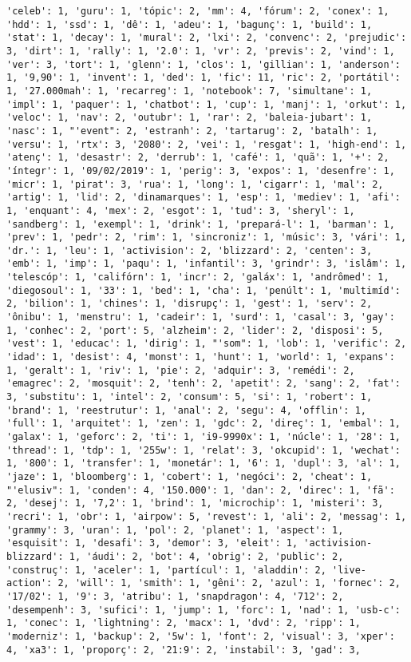 \documentclass[11pt]{article}
\begin{document}
\begin{Verbatim}[commandchars=\\\{\}]
'celeb': 1, 'guru': 1, 'tópic': 2, 'mm': 4, 'fórum': 2, 'conex': 1, 'hdd': 1, 'ssd': 1, 'dê': 1, 'adeu': 1, 'bagunç': 1, 'build': 1, 'stat': 1, 'decay': 1, 'mural': 2, 'lxi': 2, 'convenc': 2, 'prejudic': 3, 'dirt': 1, 'rally': 1, '2.0': 1, 'vr': 2, 'previs': 2, 'vind': 1, 'ver': 3, 'tort': 1, 'glenn': 1, 'clos': 1, 'gillian': 1, 'anderson': 1, '9,90': 1, 'invent': 1, 'ded': 1, 'fic': 11, 'ric': 2, 'portátil': 1, '27.000mah': 1, 'recarreg': 1, 'notebook': 7, 'simultane': 1, 'impl': 1, 'paquer': 1, 'chatbot': 1, 'cup': 1, 'manj': 1, 'orkut': 1, 'veloc': 1, 'nav': 2, 'outubr': 1, 'rar': 2, 'baleia-jubart': 1, 'nasc': 1, "'event": 2, 'estranh': 2, 'tartarug': 2, 'batalh': 1, 'versu': 1, 'rtx': 3, '2080': 2, 'vei': 1, 'resgat': 1, 'high-end': 1, 'atenç': 1, 'desastr': 2, 'derrub': 1, 'café': 1, 'quã': 1, '+': 2, 'íntegr': 1, '09/02/2019': 1, 'perig': 3, 'expos': 1, 'desenfre': 1, 'micr': 1, 'pirat': 3, 'rua': 1, 'long': 1, 'cigarr': 1, 'mal': 2, 'artig': 1, 'lid': 2, 'dinamarques': 1, 'esp': 1, 'mediev': 1, 'afi': 1, 'enquant': 4, 'mex': 2, 'esgot': 1, 'tud': 3, 'sheryl': 1, 'sandberg': 1, 'exempl': 1, 'drink': 1, 'prepará-l': 1, 'barman': 1, 'prev': 1, 'pedr': 2, 'rim': 1, 'sincroniz': 1, 'músic': 3, 'vári': 1, 'dr.': 1, 'leu': 1, 'activision': 2, 'blizzard': 2, 'centen': 3, 'emb': 1, 'imp': 1, 'paqu': 1, 'infantil': 3, 'grindr': 3, 'islâm': 1, 'telescóp': 1, 'califórn': 1, 'incr': 2, 'galáx': 1, 'andrômed': 1, 'diegosoul': 1, '33': 1, 'bed': 1, 'cha': 1, 'penúlt': 1, 'multimíd': 2, 'bilion': 1, 'chines': 1, 'disrupç': 1, 'gest': 1, 'serv': 2, 'ônibu': 1, 'menstru': 1, 'cadeir': 1, 'surd': 1, 'casal': 3, 'gay': 1, 'conhec': 2, 'port': 5, 'alzheim': 2, 'lider': 2, 'disposi': 5, 'vest': 1, 'educac': 1, 'dirig': 1, "'som": 1, 'lob': 1, 'verific': 2, 'idad': 1, 'desist': 4, 'monst': 1, 'hunt': 1, 'world': 1, 'expans': 1, 'geralt': 1, 'riv': 1, 'pie': 2, 'adquir': 3, 'remédi': 2, 'emagrec': 2, 'mosquit': 2, 'tenh': 2, 'apetit': 2, 'sang': 2, 'fat': 3, 'substitu': 1, 'intel': 2, 'consum': 5, 'si': 1, 'robert': 1, 'brand': 1, 'reestrutur': 1, 'anal': 2, 'segu': 4, 'offlin': 1, 'full': 1, 'arquitet': 1, 'zen': 1, 'gdc': 2, 'direç': 1, 'embal': 1, 'galax': 1, 'geforc': 2, 'ti': 1, 'i9-9990x': 1, 'núcle': 1, '28': 1, 'thread': 1, 'tdp': 1, '255w': 1, 'relat': 3, 'okcupid': 1, 'wechat': 1, '800': 1, 'transfer': 1, 'monetár': 1, '6': 1, 'dupl': 3, 'al': 1, 'jaze': 1, 'bloomberg': 1, 'cobert': 1, 'negóci': 2, 'cheat': 1, "'elusiv": 1, 'conden': 4, '150.000': 1, 'dan': 2, 'direc': 1, 'fã': 2, 'desej': 1, '7,2': 1, 'brind': 1, 'microchip': 1, 'misteri': 3, 'recri': 1, 'obr': 1, 'airpow': 5, 'revest': 1, 'ali': 2, 'messag': 1, 'grammy': 3, 'uran': 1, 'pol': 2, 'planet': 1, 'aspect': 1, 'esquisit': 1, 'desafi': 3, 'demor': 3, 'eleit': 1, 'activision-blizzard': 1, 'áudi': 2, 'bot': 4, 'obrig': 2, 'public': 2, 'construç': 1, 'aceler': 1, 'partícul': 1, 'aladdin': 2, 'live-action': 2, 'will': 1, 'smith': 1, 'gêni': 2, 'azul': 1, 'fornec': 2, '17/02': 1, '9': 3, 'atribu': 1, 'snapdragon': 4, '712': 2, 'desempenh': 3, 'sufici': 1, 'jump': 1, 'forc': 1, 'nad': 1, 'usb-c': 1, 'conec': 1, 'lightning': 2, 'macx': 1, 'dvd': 2, 'ripp': 1, 'moderniz': 1, 'backup': 2, '5w': 1, 'font': 2, 'visual': 3, 'xper': 4, 'xa3': 1, 'proporç': 2, '21:9': 2, 'instabil': 3, 'gad': 3, 
\end{Verbatim}
\end{document}
